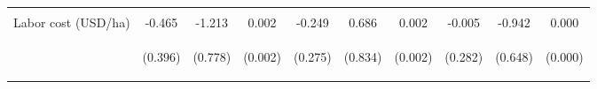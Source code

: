 \begin{center}
\begin{tabular}{lccccccccc}
\vspace{4pt} & \begin{footnotesize}[0.703]\end{footnotesize} & \begin{footnotesize}[0.903]\end{footnotesize} & \begin{footnotesize}[0.012]\end{footnotesize} & \begin{footnotesize}[0.333]\end{footnotesize} & \begin{footnotesize}[0.409]\end{footnotesize} & \begin{footnotesize}[0.447]\end{footnotesize} & \begin{footnotesize}[0.889]\end{footnotesize} & \begin{footnotesize}[0.438]\end{footnotesize} & \begin{footnotesize}[0.622]\end{footnotesize} \\
Labor cost (USD/ha) & -0.465 & -1.213 & 0.002 & -0.249 & 0.686 & 0.002 & -0.005 & -0.942 & 0.000 \\
 & \begin{footnotesize}(0.396)\end{footnotesize} & \begin{footnotesize}(0.778)\end{footnotesize} & \begin{footnotesize}(0.002)\end{footnotesize} & \begin{footnotesize}(0.275)\end{footnotesize} & \begin{footnotesize}(0.834)\end{footnotesize} & \begin{footnotesize}(0.002)\end{footnotesize} & \begin{footnotesize}(0.282)\end{footnotesize} & \begin{footnotesize}(0.648)\end{footnotesize} & \begin{footnotesize}(0.000)\end{footnotesize} \\

\end{tabular}
\end{center}
